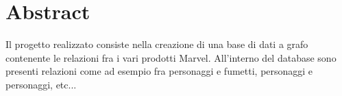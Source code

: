 \documentclass[
10pt, %
a4paper, %
oneside, %
headinclude,footinclude, %
BCOR5mm, %
]{scrartcl}
\title{\normalfont\spacedallcaps{Article Title}} %
\author{\spacedlowsmallcaps{Fabrizio Cominetti, Davide Abete, Ruben Agazzi}} %
\date{} %
\begin{document}

\renewcommand{\sectionmark}[1]{\markright{\spacedlowsmallcaps{#1}}} %
\lehead{\mbox{\llap{\small\thepage\kern1em\color{halfgray} \vline}\color{halfgray}\hspace{0.5em}\rightmark\hfil}} %

\pagestyle{scrheadings} %


\maketitle %

\setcounter{tocdepth}{2} %

\tableofcontents %



\section*{Abstract} %

Il progetto realizzato consiste nella creazione di una base di dati a grafo contenente le relazioni fra i vari prodotti Marvel. All'interno del database sono presenti relazioni come ad esempio fra personaggi e fumetti, personaggi e personaggi, etc... 

\end{document}
